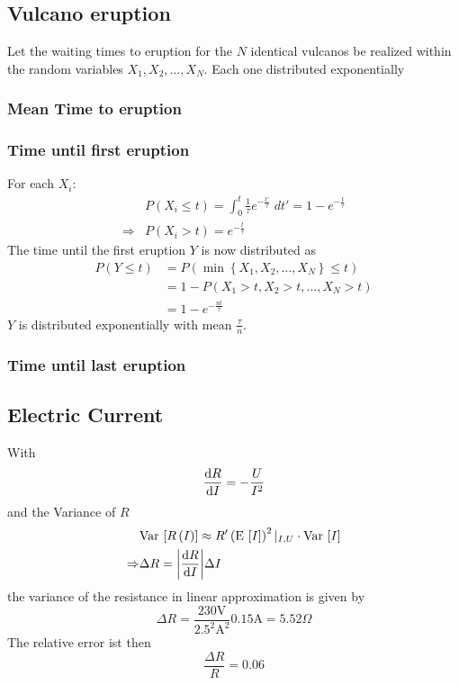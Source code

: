 \subsection{Vulcano eruption}
Let the waiting times to eruption for the $N$ identical vulcanos be realized within
the random variables $X_1, X_2, \dots, X_N$. Each one distributed exponentially
\subsubsection{Mean Time to eruption}
\subsubsection{Time until first eruption}
For each $X_i$:
\begin{align}
    &P\left(X_i\leq t\right)=\int_0^t\frac{1}{\tau}e^{-\frac{t'}{\tau}}\;dt'=1-e^{-\frac{t}{\tau}}
    \\\Rightarrow&P\left(X_i> t\right)=e^{-\frac{t}{\tau}}
\end{align}
The time until the first eruption $Y$ is now distributed as
\begin{align}
    P\left(Y\leq t\right)&=P\left(\min\left\{X_1,X_2,\dots,X_N\right\}\leq t\right)
    \\&=1-P\left(X_1>t, X_2>t,\dots,X_N>t\right)
    \\&=1-e^{-\frac{nt}{\tau}}
\end{align}
$Y$ is  distributed exponentially with mean $\frac{\tau}{n}$.
\subsubsection{Time until last eruption}
\subsection{Electric Current}
With
\begin{equation}
    \dv{R}{I}=-\frac{U}{I^2}
\end{equation}
and the Variance of $R$
\begin{align}
    &{\textrm{Var}}\,\left[R\left(I\right)\right]\approx R'\left({\textrm{E}}\,\left[I\right]\right)^2\vert_{I,U}\cdot{\textrm{Var}}\,\left[I\right]
    \\\Rightarrow&\Delta R= \abs{\dv{R}{I}}\Delta I
\end{align}
the variance of the resistance in linear approximation is given by
\begin{equation}
    \Delta R = \frac{230\text{V}}{2.5^2\text{A}^2}0.15\text{A}=5.52\Omega
\end{equation}
The relative error ist then
\begin{equation}
    \frac{\Delta R}{R}= 0.06
\end{equation}
